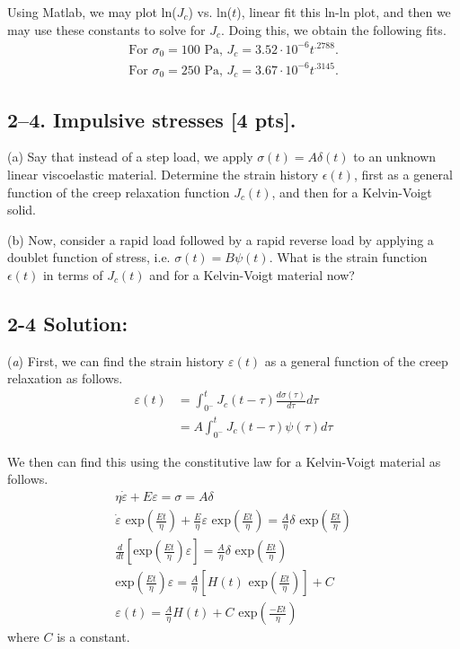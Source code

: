 Using Matlab, we may plot ln($J_c$) vs. ln($t$), linear fit this ln-ln plot, and then we may use these constants to solve for $J_c$. Doing this, we obtain the following fits.
\begin{gather*}
    \text{For }\sigma_0=100\text{ Pa, } J_c=3.52\cdot10^{-6}t^{.2788}.\\
    \text{For }\sigma_0=250\text{ Pa, } J_c=3.67\cdot10^{-6}t^{.3145}.
\end{gather*}

\bigskip
\subsection*{2--4. \textbf{Impulsive stresses} [4 pts].}

(a) Say that instead of a step load, we apply $\sigma(t) = A \delta(t)$ to an unknown linear viscoelastic material. 
Determine the strain history $\epsilon(t)$, first as a general function of the creep relaxation function $J_c(t)$, and then for a Kelvin-Voigt solid. 

(b) Now, consider a rapid load followed by a rapid reverse load by applying a doublet function of stress, i.e. $\sigma(t) = B \psi(t)$. 
What is the strain function $\epsilon(t)$ in terms of $J_c(t)$ and for a Kelvin-Voigt material now? 

\subsection*{\textbf{2-4 Solution:}}
(\textit{a}) First, we can find the strain history $\varepsilon(t)$ as a general function of the creep relaxation as follows.
\begin{align*}
    \varepsilon(t)&=\int_{0^-}^tJ_c(t-\tau)\frac{d\sigma(\tau)}{d\tau}d\tau\\
    &=A\int_{0^-}^tJ_c(t-\tau)\psi(\tau)d\tau
\end{align*}

We then can find this using the constitutive law for a Kelvin-Voigt material as follows.
\begin{gather*}
    \eta\dot{\varepsilon}+E\varepsilon=\sigma=A\delta\\
    \dot{\varepsilon}\text{ exp}( \frac{Et}{\eta})+\frac{E}{\eta}\varepsilon\text{ exp}(\frac{Et}{\eta})=\frac{A}{\eta}\delta\text{ exp}(\frac{Et}{\eta})\\
    \frac{d}{dt}[\text{exp}(\frac{Et}{\eta})\varepsilon]=\frac{A}{\eta}\delta\text{ exp}(\frac{Et}{\eta})\\
    \text{exp}(\frac{Et}{\eta})\varepsilon=\frac{A}{\eta}[H(t)\text{ exp}(\frac{Et}{\eta})]+C\\
    \varepsilon(t)=\frac{A}{\eta}H(t)+C\text{ exp}(\frac{-Et}{\eta})
\end{gather*}
where $C$ is a constant.

